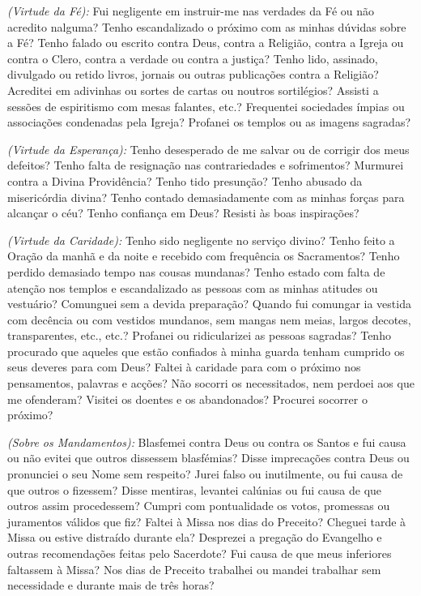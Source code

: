 \emph{(Virtude da Fé):} Fui negligente em instruir-me nas verdades da Fé ou não acredito nalguma? Tenho escandalizado o próximo com as minhas dúvidas sobre a Fé? Tenho falado ou escrito contra Deus, contra a Religião, contra a Igreja ou contra o Clero, contra a verdade ou contra a justiça? Tenho lido, assinado, divulgado ou retido livros, jornais ou outras publicações contra a Religião? Acreditei em adivinhas ou sortes de cartas ou noutros sortilégios? Assisti a sessões de espiritismo com mesas falantes, etc.? Frequentei sociedades ímpias ou associações condenadas pela Igreja? Profanei os templos ou as imagens sagradas?

\emph{(Virtude da Esperança):} Tenho desesperado de me salvar ou de corrigir dos meus defeitos? Tenho falta de resignação nas contrariedades e sofrimentos? Murmurei contra a Divina Providência? Tenho tido presunção? Tenho abusado da misericórdia divina? Tenho contado demasiadamente com as minhas forças para alcançar o céu? Tenho confiança em Deus? Resisti às boas inspirações?

\emph{(Virtude da Caridade):} Tenho sido negligente no serviço divino? Tenho feito a Oração da manhã e da noite e recebido com frequência os Sacramentos? Tenho perdido demasiado tempo nas cousas mundanas? Tenho estado com falta de atenção nos templos e escandalizado as pessoas com as minhas atitudes ou vestuário? Comunguei sem a devida preparação? Quando fui comungar ia vestida com decência ou com vestidos mundanos, sem mangas nem meias, largos decotes, transparentes, etc., etc.? Profanei ou ridicularizei as pessoas sagradas? Tenho procurado que aqueles que estão confiados à minha guarda tenham cumprido os seus deveres para com Deus? Faltei à caridade para com o próximo nos pensamentos, palavras e acções? Não socorri os necessitados, nem perdoei aos que me ofenderam? Visitei os doentes e os abandonados? Procurei socorrer o próximo?

\emph{(Sobre os Mandamentos):} Blasfemei contra Deus ou contra os Santos e fui causa ou não evitei que outros dissessem blasfémias? Disse imprecações contra Deus ou pronunciei o seu Nome sem respeito? Jurei falso ou inutilmente, ou fui causa de que outros o fizessem? Disse mentiras, levantei calúnias ou fui causa de que outros assim procedessem? Cumpri com pontualidade os votos, promessas ou juramentos válidos que fiz? Faltei à Missa nos dias do Preceito? Cheguei tarde à Missa ou estive distraído durante ela? Desprezei a pregação do Evangelho e outras recomendações feitas pelo Sacerdote? Fui causa de que meus inferiores faltassem à Missa? Nos dias de Preceito trabalhei ou mandei trabalhar sem necessidade e durante mais de três horas?

